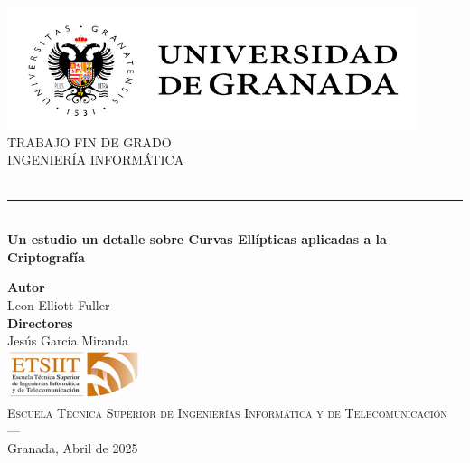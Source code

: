 \begin{titlepage}
 
 
\newlength{\centeroffset}
\setlength{\centeroffset}{-0.5\oddsidemargin}
\addtolength{\centeroffset}{0.5\evensidemargin}
\thispagestyle{empty}

\noindent\hspace*{\centeroffset}\begin{minipage}{\textwidth}

\centering
\includegraphics[width=0.9\textwidth]{imagenes/logo_ugr.jpg}\\[1.4cm]

\textsc{ \Large TRABAJO FIN DE GRADO\\[0.2cm]}
\textsc{ INGENIERÍA INFORMÁTICA}\\[1cm]
% 
{\Huge\bfseries {\myTitle}\\
}
\noindent\rule[-1ex]{\textwidth}{3pt}\\[3.5ex]
{\large\bfseries Un estudio un detalle sobre Curvas Ellípticas aplicadas a la Criptografía}
\end{minipage}

\vspace{2.5cm}
\noindent\hspace*{\centeroffset}\begin{minipage}{\textwidth}
\centering

\textbf{Autor}\\ {Leon Elliott Fuller}\\[2.5ex]
\textbf{Directores}\\
{Jesús García Miranda\\[2cm]}
\includegraphics[width=0.3\textwidth]{imagenes/etsiit_logo.png}\\[0.1cm]
\textsc{Escuela Técnica Superior de Ingenierías Informática y de Telecomunicación}\\
\textsc{---}\\
Granada, Abril de 2025
\end{minipage}
\end{titlepage}


